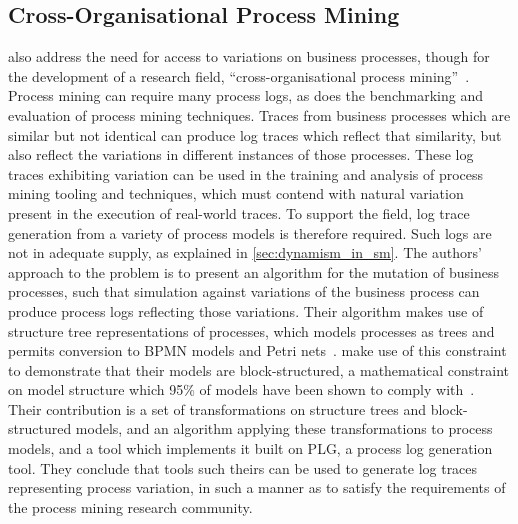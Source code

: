 \subsection{Cross-Organisational Process Mining}

\citeauthor{pourmasoumi2015business} also address the need for access to
variations on business processes, though for the development of a research
field, ``cross-organisational process mining''~\cite{pourmasoumi2015business}.
Process mining can require many process logs, as does the benchmarking and
evaluation of process mining techniques. Traces from business processes which
are similar but not identical can produce log traces which reflect that
similarity, but also reflect the variations in different instances of those
processes. These log traces exhibiting variation can be used in the training and
analysis of process mining tooling and techniques, which must contend with
natural variation present in the execution of real-world traces. To support the
field, log trace generation from a variety of process models is therefore
required. Such logs are not in adequate supply, as explained in
\cref{sec:dynamism_in_sm}. The authors' approach to the problem is to present an
algorithm for the mutation of business processes, such that simulation against
variations of the business process can produce process logs reflecting those
variations. Their algorithm makes use of structure tree representations of
processes, which models processes as trees and permits conversion to BPMN models
and Petri nets~\cite{buijs2014flexible}. \citeauthor{pourmasoumi2015business}
make use of this constraint to demonstrate that their models are
block-structured, a mathematical constraint on model structure which 95\% of
models have been shown to comply with~\cite{chenthesis}. Their contribution is a
set of transformations on structure trees and block-structured models, and an
algorithm applying these transformations to process models, and a tool which
implements it built on PLG, a process log generation tool. They conclude that
tools such theirs can be used to generate log traces representing process
variation, in such a manner as to satisfy the requirements of the process mining
research community.

